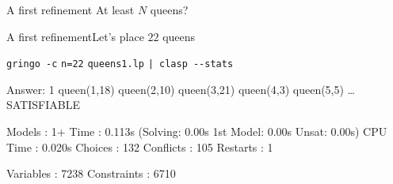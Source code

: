 \begin{frame}[fragile]{A first refinement}
  At least $N$ queens?\hfill  \alert<4>{   }
\end{frame}
\begin{frame}[fragile]{A first refinement}{Let's place \alert{$22$} queens}
\begin{block}{\alert<1>{\lstinline{gringo -c} \alert{\lstinline{n=22}} \lstinline{queens1.lp} \lstinline{| clasp --stats}}}
\vspace*{-3mm}
\pause\footnotesize%
\begin{semiverbatim}
Answer: 1
queen(1,18) queen(2,10) queen(3,21) queen(4,3) queen(5,5) \dots{}
SATISFIABLE

Models      : 1+
\alert<2>{Time        : 0.113s} (Solving: 0.00s 1st Model: 0.00s Unsat: 0.00s)
CPU Time    : 0.020s
Choices     : 132
\alert<2>{Conflicts   : 105}
Restarts    : 1

Variables   : 7238
Constraints : 6710
\end{semiverbatim}
\end{block}
\end{frame}
